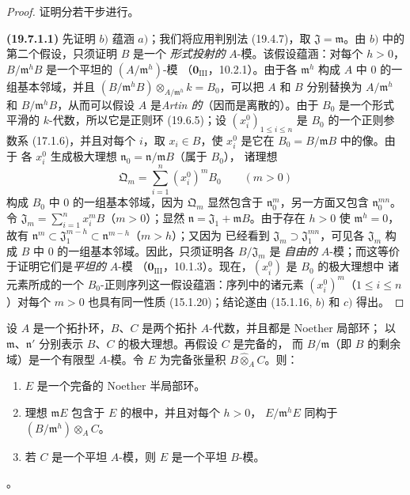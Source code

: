 \begin{proof}
证明分若干步进行。

\medskip
\noindent{}\label{0.19.7.1.1-fr}\textbf{(19.7.1.1)}\enspace
先证明 $b)$ 蕴涵 $a)$；我们将应用判别法 (19.4.7)，取
$\mathfrak J=\mathfrak m$。由 $b)$ 中的第二个假设，只须证明 $B$ 是一个
\emph{形式投射的} $A$-模。该假设蕴涵：对每个 $h>0$，
$B/\mathfrak m^hB$ 是一个平坦的 $(A/\mathfrak m^h)$-模
（$\mathbf 0_{\mathrm{III}}$，10.2.1）。由于各 $\mathfrak m^h$ 构成 $A$ 中
0 的一组基本邻域，并且
$(B/\mathfrak m^hB)\otimes_{A/\mathfrak m^h}k=B_0$，可以把 $A$ 和 $B$
分别替换为 $A/\mathfrak m^h$ 和 $B/\mathfrak m^hB$，从而可以假设
$A$ 是\emph{Artin 的}（因而是离散的）。由于 $B_0$ 是一个形式平滑的
$k$-代数，所以它是正则环 (19.6.5)；设
$(x_i^0)_{1\leq i\leq n}$ 是 $B_0$ 的一个正则参数系 (17.1.6)，并且对每个
$i$，取 $x_i\in B$，使 $x_i^0$ 是它在 $B_0=B/\mathfrak mB$ 中的像。由于
各 $x_i^0$ 生成极大理想 $\mathfrak n_0=\mathfrak n/\mathfrak mB$（属于 $B_0$），
诸理想
\[
  \mathfrak Q_m=\sum_{i=1}^n(x_i^0)^mB_0 \qquad (m>0)
\]
构成 $B_0$ 中 0 的一组基本邻域，因为 $\mathfrak Q_m$ 显然包含于
$\mathfrak n_0^m$，另一方面又包含 $\mathfrak n_0^{mn}$。令
$\mathfrak J_m=\sum_{i=1}^n x_i^mB$（$m>0$）；显然
$\mathfrak n=\mathfrak J_1+\mathfrak mB$。由于存在 $h>0$ 使
$\mathfrak m^h=0$，故有
$\mathfrak n^m\subset\mathfrak J_1^{m-h}\subset\mathfrak n^{m-h}$（$m>h$）；又因为
已经看到 $\mathfrak J_m\supset\mathfrak J_1^{mn}$，可见各 $\mathfrak J_m$
构成 $B$ 中 0 的一组基本邻域。因此，只须证明各 $B/\mathfrak J_m$ 是
\emph{自由的} $A$-模；而这等价于证明它们是\emph{平坦的} $A$-模
（$\mathbf 0_{\mathrm{III}}$，10.1.3）。现在，$(x_i^0)$ 是 $B_0$ 的极大理想中
诸元素所成的一个 $B_0$-正则序列这一假设蕴涵：序列中的诸元素
$(x_i^0)^m$（$1\leq i\leq n$）对每个 $m>0$ 也具有同一性质 (15.1.20)；结论遂由
(15.1.16, $b)$ 和 $c)$ 得出。
\end{proof}

\begin{lemma}[19.7.1.2]
\label{0.19.7.1.2-fr}
设 $A$ 是一个拓扑环，$B$、$C$ 是两个拓扑 $A$-代数，并且都是 Noether 局部环；
以 $\mathfrak m$、$\mathfrak n'$ 分别表示 $B$、$C$ 的极大理想。再假设 $C$ 是完备的，
而 $B/\mathfrak m$（即 $B$ 的剩余域）是一个有限型 $A$-模。令 $E$ 为完备张量积
$B\widehat\otimes_A C$。则：
\begin{enumerate}
  \item[(i)] $E$ 是一个完备的 Noether 半局部环。
  \item[(ii)] 理想 $\mathfrak mE$ 包含于 $E$ 的根中，并且对每个 $h>0$，
  $E/\mathfrak m^hE$ 同构于 $(B/\mathfrak m^h)\otimes_A C$。
  \item[(iii)] 若 $C$ 是一个平坦 $A$-模，则 $E$ 是一个平坦 $B$-模。
\end{enumerate}
\end{lemma}
。

